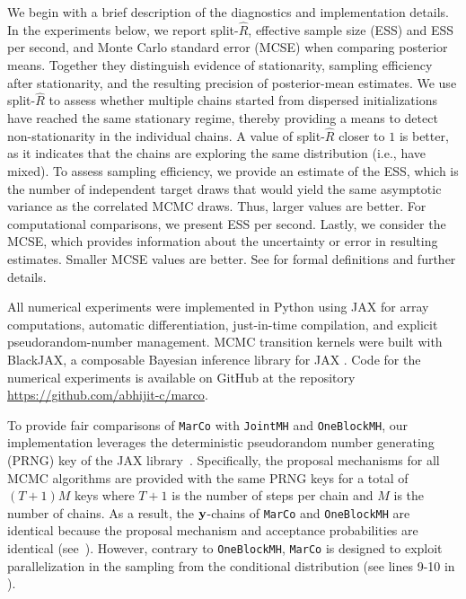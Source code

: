 \documentclass[onefignum,onetabnum]{siamonline250211}
\newcommand{\bfy}{{\bf y}}
\newcommand{\MarCo}{\textnormal{\texttt{MarCo}}\xspace}
\newcommand{\Joint}{\textnormal{\texttt{JointMH}}\xspace}
\newcommand{\OneblockMCMC}{\textnormal{\texttt{OneBlockMH}}\xspace}
\begin{document}
We begin with a brief description of the diagnostics and implementation details.
%
%
In the experiments below, we report split-$\hat R$, effective sample size (ESS) and ESS per second, and Monte Carlo standard error (MCSE) when comparing posterior means. Together they distinguish evidence of stationarity, sampling efficiency after stationarity, and the resulting precision of posterior-mean estimates. We use split-$\hat R$ to assess whether multiple chains started from dispersed initializations have reached the same stationary regime, thereby providing a means to detect non-stationarity in the individual chains. A value of split-$\hat R$ closer to $1$ is better, as it indicates that the chains are exploring the same distribution (i.e., have mixed). To assess sampling efficiency, we provide an estimate of the ESS, which is the number of independent target draws that would yield the same asymptotic variance as the correlated MCMC draws. Thus, larger values are better. For computational comparisons, we present ESS per second.
Lastly, we consider the MCSE, which provides information about the uncertainty or error in resulting estimates. Smaller MCSE values are better. See \cite{carpenter_stan_2017,craiu_handbook_2026,gelman_bayesian_2013,vehtari_rank-normalization_2021} for formal definitions and further details.

All numerical experiments were implemented in Python using JAX \cite{bradbury_jax_2018} for array computations, automatic differentiation, just-in-time compilation, and explicit pseudorandom-number management.
MCMC transition kernels were built with BlackJAX, a composable Bayesian inference library for JAX \cite{cabezas_blackjax_2024}.
Code for the numerical experiments is available on GitHub at the repository \url{https://github.com/abhijit-c/marco}.

%
To provide fair comparisons of \MarCo with \Joint and \OneblockMCMC, our implementation leverages the deterministic pseudorandom number generating (PRNG) key of the JAX library~\cite{bradbury_jax_2018}.
Specifically, the proposal mechanisms for all MCMC algorithms are provided with the same PRNG keys for a total of $(T+1)M$ keys where $T + 1$ is the number of steps per chain and $M$ is the number of chains.
As a result, the $\bfy$-chains of \MarCo and \OneblockMCMC are identical because the proposal mechanism and acceptance probabilities are identical (see~).
%
%
%
%
%
However, contrary to \OneblockMCMC, \MarCo is designed to exploit parallelization in the sampling from the conditional distribution (see lines 9-10 in ).
\end{document}
